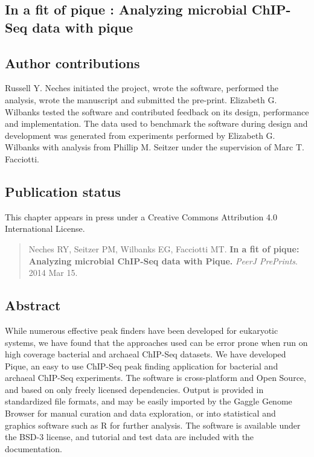 \begin{refsection}

\chapter{In a fit of pique : Analyzing microbial ChIP-Seq data with pique}


\section{Author contributions}

Russell Y. Neches initiated the project, wrote the software, performed
the analysis, wrote the manuscript and submitted the pre-print.
Elizabeth G. Wilbanks tested the software and contributed feedback on
its design, performance and implementation. The data used to benchmark
the software during design and development was generated from
experiments performed by Elizabeth G. Wilbanks with analysis from
Phillip M. Seitzer under the supervision of Marc T. Facciotti.

\section{Publication status}

This chapter appears in press under a Creative Commons Attribution 4.0
International License.

\begin{quote}
Neches RY, Seitzer PM, Wilbanks EG, Facciotti MT. {\bf In a fit of pique: Analyzing microbial ChIP-Seq data with Pique.} {\em PeerJ PrePrints}. 2014 Mar 15.
\end{quote}

\section{Abstract}

While numerous effective peak finders have been developed
for eukaryotic systems, we have found that the approaches used can be
error prone when run on high coverage bacterial and archaeal ChIP-Seq
datasets. We have developed Pique, an easy to use ChIP-Seq peak
finding application for bacterial and archaeal ChIP-Seq experiments.
The software is cross-platform and Open Source, and based on only
freely licensed dependencies. Output is provided in standardized file
formats, and may be easily imported by the Gaggle Genome Browser
\cite{gaggle_browser} for manual curation and data exploration, or
into statistical and graphics software such as R \cite{R} for further
analysis. The software is available under the BSD-3 license, and tutorial
and test data are included with the documentation.


\end{refsection}

